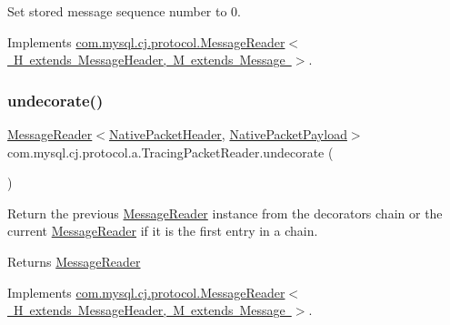 Set stored message sequence number to 0. 

Implements \mbox{\hyperlink{interfacecom_1_1mysql_1_1cj_1_1protocol_1_1_message_reader_a3161e55ab8c1bb4d533aa6d2700fb14d}{com.\+mysql.\+cj.\+protocol.\+Message\+Reader$<$ H extends Message\+Header, M extends Message $>$}}.

\mbox{\label{classcom_1_1mysql_1_1cj_1_1protocol_1_1a_1_1_tracing_packet_reader_a5fab05e4e4ab55adf0f0755d7ca6513d}} 
\subsubsection{\texorpdfstring{undecorate()}{undecorate()}}
{\footnotesize\ttfamily \mbox{\hyperlink{interfacecom_1_1mysql_1_1cj_1_1protocol_1_1_message_reader}{Message\+Reader}}$<$\mbox{\hyperlink{classcom_1_1mysql_1_1cj_1_1protocol_1_1a_1_1_native_packet_header}{Native\+Packet\+Header}}, \mbox{\hyperlink{classcom_1_1mysql_1_1cj_1_1protocol_1_1a_1_1_native_packet_payload}{Native\+Packet\+Payload}}$>$ com.\+mysql.\+cj.\+protocol.\+a.\+Tracing\+Packet\+Reader.\+undecorate (\begin{DoxyParamCaption}{ }\end{DoxyParamCaption})}

Return the previous \mbox{\hyperlink{interfacecom_1_1mysql_1_1cj_1_1protocol_1_1_message_reader}{Message\+Reader}} instance from the decorators chain or the current \mbox{\hyperlink{interfacecom_1_1mysql_1_1cj_1_1protocol_1_1_message_reader}{Message\+Reader}} if it is the first entry in a chain.

\begin{DoxyReturn}{Returns}
\mbox{\hyperlink{interfacecom_1_1mysql_1_1cj_1_1protocol_1_1_message_reader}{Message\+Reader}} 
\end{DoxyReturn}


Implements \mbox{\hyperlink{interfacecom_1_1mysql_1_1cj_1_1protocol_1_1_message_reader_a59b0e118857c167ad4a270845f19e89b}{com.\+mysql.\+cj.\+protocol.\+Message\+Reader$<$ H extends Message\+Header, M extends Message $>$}}.

\mbox{\label{classcom_1_1mysql_1_1cj_1_1protocol_1_1a_1_1_tracing_packet_reader_a92981daf5c4331ba841e31d90d6b43ed}} 
